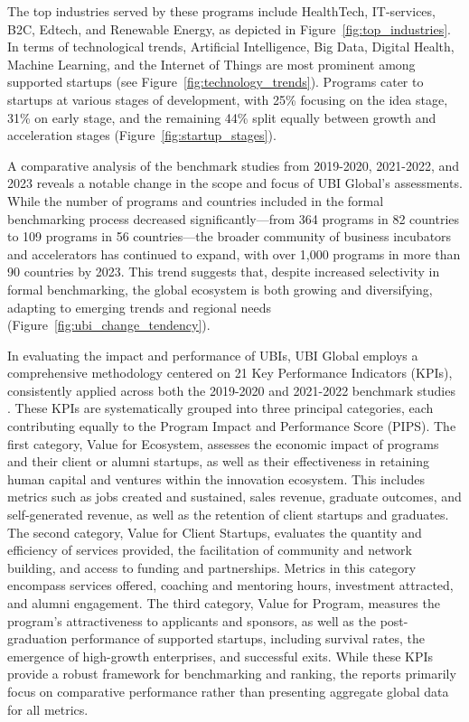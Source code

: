 \documentclass[../Main.tex]{subfiles}%
\begin{document}
	The top industries served by these programs include HealthTech, IT-services, B2C, Edtech, and Renewable Energy, as depicted in Figure~\ref{fig:top_industries}. In terms of technological trends, Artificial Intelligence, Big Data, Digital Health, Machine Learning, and the Internet of Things are most prominent among supported startups (see Figure~\ref{fig:technology_trends}). Programs cater to startups at various stages of development, with 25\% focusing on the idea stage, 31\% on early stage, and the remaining 44\% split equally between growth and acceleration stages (Figure~\ref{fig:startup_stages}).
	
	A comparative analysis of the benchmark studies from 2019-2020, 2021-2022, and 2023 reveals a notable change in the scope and focus of UBI Global's assessments. While the number of programs and countries included in the formal benchmarking process decreased significantly—from 364 programs in 82 countries to 109 programs in 56 countries—the broader community of business incubators and accelerators has continued to expand, with over 1,000 programs in more than 90 countries by 2023. This trend suggests that, despite increased selectivity in formal benchmarking, the global ecosystem is both growing and diversifying, adapting to emerging trends and regional needs (Figure~\ref{fig:ubi_change_tendency}).
	
	In evaluating the impact and performance of UBIs, UBI Global employs a comprehensive methodology centered on 21 Key Performance Indicators (KPIs), consistently applied across both the 2019-2020 and 2021-2022 benchmark studies \cite{ubi2019world, ubi2021world}. These KPIs are systematically grouped into three principal categories, each contributing equally to the Program Impact and Performance Score (PIPS). The first category, Value for Ecosystem, assesses the economic impact of programs and their client or alumni startups, as well as their effectiveness in retaining human capital and ventures within the innovation ecosystem. This includes metrics such as jobs created and sustained, sales revenue, graduate outcomes, and self-generated revenue, as well as the retention of client startups and graduates. The second category, Value for Client Startups, evaluates the quantity and efficiency of services provided, the facilitation of community and network building, and access to funding and partnerships. Metrics in this category encompass services offered, coaching and mentoring hours, investment attracted, and alumni engagement. The third category, Value for Program, measures the program's attractiveness to applicants and sponsors, as well as the post-graduation performance of supported startups, including survival rates, the emergence of high-growth enterprises, and successful exits. While these KPIs provide a robust framework for benchmarking and ranking, the reports primarily focus on comparative performance rather than presenting aggregate global data for all metrics.
	
\end{document}
